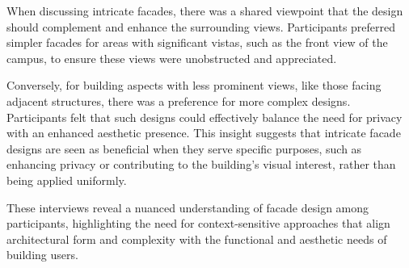 When discussing intricate facades, there was a shared viewpoint that the design should complement and enhance the surrounding views.
Participants preferred simpler facades for areas with significant vistas, such as the front view of the campus, to ensure these views were unobstructed and appreciated.

Conversely, for building aspects with less prominent views, like those facing adjacent structures, there was a preference for more complex designs.
Participants felt that such designs could effectively balance the need for privacy with an enhanced aesthetic presence.
This insight suggests that intricate facade designs are seen as beneficial when they serve specific purposes, such as enhancing privacy or contributing to the building’s visual interest, rather than being applied uniformly.

These interviews reveal a nuanced understanding of facade design among participants, highlighting the need for context-sensitive approaches that align architectural form and complexity with the functional and aesthetic needs of building users.











